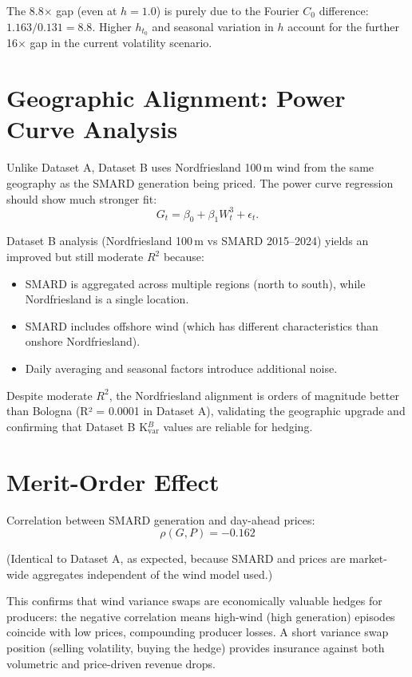 \documentclass[11pt, a4paper, twoside]{article}
\begin{document}
The 8.8× gap (even at $h=1.0$) is purely due to the Fourier $C_0$ difference: $1.163 / 0.131 = 8.8$. Higher $h_{t_0}$ and seasonal variation in $h$ account for the further 16× gap in the current volatility scenario.

\section{Geographic Alignment: Power Curve Analysis}

Unlike Dataset A, Dataset B uses Nordfriesland 100\,m wind from the same geography as the SMARD generation being priced. The power curve regression should show much stronger fit:
\begin{equation}
G_t = \beta_0 + \beta_1 W_t^3 + \epsilon_t.
\end{equation}

Dataset B analysis (Nordfriesland 100\,m vs SMARD 2015--2024) yields an improved but still moderate $R^2$ because:
\begin{itemize}
\item SMARD is aggregated across multiple regions (north to south), while Nordfriesland is a single location.
\item SMARD includes offshore wind (which has different characteristics than onshore Nordfriesland).
\item Daily averaging and seasonal factors introduce additional noise.
\end{itemize}

Despite moderate $R^2$, the Nordfriesland alignment is orders of magnitude better than Bologna (R² = 0.0001 in Dataset A), validating the geographic upgrade and confirming that Dataset B K$_{\text{var}}^B$ values are reliable for hedging.

\section{Merit-Order Effect}

Correlation between SMARD generation and day-ahead prices:
\begin{equation}
\rho(G, P) = -0.162
\end{equation}

(Identical to Dataset A, as expected, because SMARD and prices are market-wide aggregates independent of the wind model used.)

This confirms that wind variance swaps are economically valuable hedges for producers: the negative correlation means high-wind (high generation) episodes coincide with low prices, compounding producer losses. A short variance swap position (selling volatility, buying the hedge) provides insurance against both volumetric and price-driven revenue drops.
\end{document}
